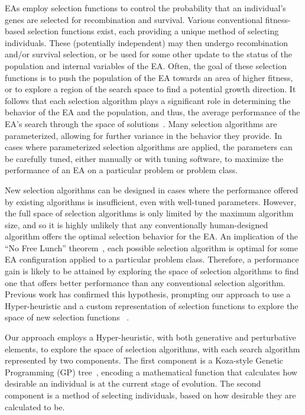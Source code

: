 \documentclass[sigconf]{acmart}
\begin{document}
EAs employ selection functions to control the probability that an individual's genes are selected for recombination and survival. Various conventional fitness-based selection functions exist, each providing a unique method of selecting individuals. These (potentially independent) may then undergo recombination and/or survival selection, or be used for some other update to the status of the population and internal variables of the EA. Often, the goal of these selection functions is to push the population of the EA towards an area of higher fitness, or to explore a region of the search space to find a potential growth direction. It follows that each selection algorithm plays a significant role in determining the behavior of the EA and the population, and thus, the average performance of the EA's search through the space of solutions~\citep{woodward2010metaBias}. Many selection algorithms are parameterized, allowing for further variance in the behavior they provide. In cases where parameterized selection algorithms are applied, the parameters can be carefully tuned, either manually or with tuning software, to maximize the performance of an EA on a particular problem or problem class.

New selection algorithms can be designed in cases where the performance offered by existing algorithms is insufficient, even with well-tuned parameters. However, the full space of selection algorithms is only limited by the maximum algorithm size, and so it is highly unlikely that any conventionally human-designed algorithm offers the optimal selection behavior for the EA. An implication of the ``No Free Lunch'' theorem~\citep{wolpert1995noFreeLunch}, each possible selection algorithm is optimal for some EA configuration applied to a particular problem class. Therefore, a performance gain is likely to be attained by exploring the space of selection algorithms to find one that offers better performance than any conventional selection algorithm. Previous work has confirmed this hypothesis, prompting our approach to use a Hyper-heuristic and a custom representation of selection functions to explore the space of new selection functions ~\citep{woodward2011selection}.

Our approach employs a Hyper-heuristic, with both generative and perturbative elements, to explore the space of selection algorithms, with each search algorithm represented by two components. The first component is a Koza-style Genetic Programming (GP) tree~\citep{koza1994genetic}, encoding a mathematical function that calculates how desirable an individual is at the current stage of evolution. The second component is a method of selecting individuals, based on how desirable they are calculated to be.
\end{document}
